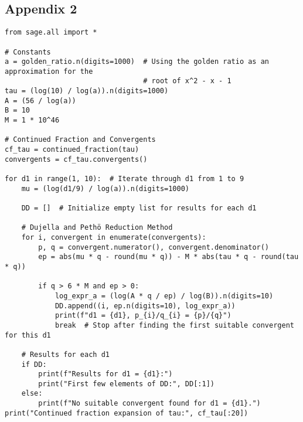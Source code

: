 \subsection*{Appendix 2}\label{app2}
\begin{verbatim}
from sage.all import *

# Constants
a = golden_ratio.n(digits=1000)  # Using the golden ratio as an approximation for the 
                                 # root of x^2 - x - 1
tau = (log(10) / log(a)).n(digits=1000)
A = (56 / log(a))
B = 10
M = 1 * 10^46

# Continued Fraction and Convergents
cf_tau = continued_fraction(tau)
convergents = cf_tau.convergents()

for d1 in range(1, 10):  # Iterate through d1 from 1 to 9
    mu = (log(d1/9) / log(a)).n(digits=1000)

    DD = []  # Initialize empty list for results for each d1

    # Dujella and Pethö Reduction Method
    for i, convergent in enumerate(convergents):
        p, q = convergent.numerator(), convergent.denominator()
        ep = abs(mu * q - round(mu * q)) - M * abs(tau * q - round(tau * q))

        if q > 6 * M and ep > 0:
            log_expr_a = (log(A * q / ep) / log(B)).n(digits=10)
            DD.append((i, ep.n(digits=10), log_expr_a))
            print(f"d1 = {d1}, p_{i}/q_{i} = {p}/{q}")
            break  # Stop after finding the first suitable convergent for this d1

    # Results for each d1
    if DD:
        print(f"Results for d1 = {d1}:")
        print("First few elements of DD:", DD[:1])
    else:
        print(f"No suitable convergent found for d1 = {d1}.")
print("Continued fraction expansion of tau:", cf_tau[:20])
\end{verbatim}

